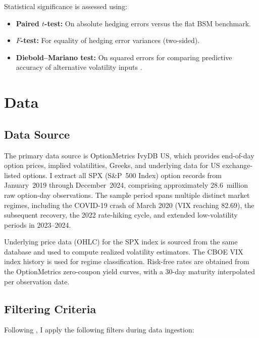 \documentclass[12pt, letterpaper]{article}
\begin{document}
Statistical significance is assessed using:
\begin{itemize}
    \item \textbf{Paired $t$-test:} On absolute hedging errors versus the flat BSM benchmark.
    \item \textbf{$F$-test:} For equality of hedging error variances (two-sided).
    \item \textbf{Diebold--Mariano test:} On squared errors for comparing predictive accuracy of alternative volatility inputs \citep{DieboldMariano1995}.
\end{itemize}


\section{Data}
\label{sec:data}

\subsection{Data Source}

The primary data source is OptionMetrics IvyDB US, which provides end-of-day option prices, implied volatilities, Greeks, and underlying data for US exchange-listed options. I extract all SPX (S\&P~500 Index) option records from January~2019 through December~2024, comprising approximately 28.6~million raw option-day observations. The sample period spans multiple distinct market regimes, including the COVID-19 crash of March 2020 (VIX reaching 82.69), the subsequent recovery, the 2022 rate-hiking cycle, and extended low-volatility periods in 2023--2024.

Underlying price data (OHLC) for the SPX index is sourced from the same database and used to compute realized volatility estimators. The CBOE VIX index history is used for regime classification. Risk-free rates are obtained from the OptionMetrics zero-coupon yield curves, with a 30-day maturity interpolated per observation date.

\subsection{Filtering Criteria}

Following \citet{Hull2017}, I apply the following filters during data ingestion:
\end{document}
